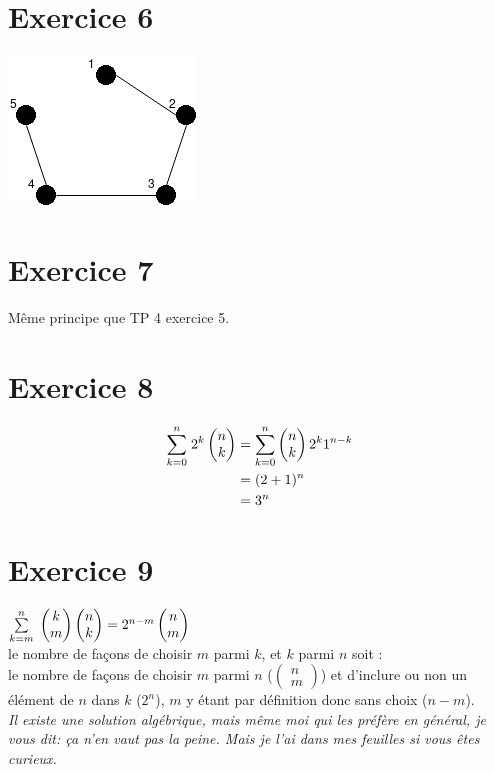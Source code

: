 \documentclass[fontsize=10pt]{article}
\begin{document}
\section*{Exercice 6}
\includegraphics[scale=1]{TP6Exo5.jpg} 

\section*{Exercice 7}
Même principe que TP 4 exercice 5.

\section*{Exercice 8}
\begin{alignat*}{5}
\underset{k=0}{\overset{n}{\sum}} \hspace{0.1cm}2^k\begin{pmatrix} n \\k\end{pmatrix} &= \underset{k=0}{\overset{n}{\sum}} \begin{pmatrix} n \\k\end{pmatrix} 2^k 1^{n-k}\\
&=(2+1)^n\\
&=3^n
\end{alignat*}

\section*{Exercice 9}

$\underset{k=m}{\overset{n}{\sum}}\hspace{0.1cm}\begin{pmatrix} k\\m\end{pmatrix}\begin{pmatrix} n\\k\end{pmatrix} = 2^{n-m}\begin{pmatrix} n\\m\end{pmatrix}$\\
le nombre de façons de choisir $m$ parmi $k$, et $k$ parmi $n$ soit : \\
le nombre de façons de choisir $m$ parmi $n$ 
($\begin{pmatrix}
n\\
m
\end{pmatrix}$)
 et d'inclure ou non un élément de $n$ dans $k$ ($2^n$), $m$ y étant par définition donc sans choix ($n-m$).\\
\textit{Il existe une solution algébrique, mais même moi qui les préfère en général, je vous dit: ça n'en vaut pas la peine. Mais je l'ai dans mes feuilles si vous êtes curieux.}\\
\end{document}
